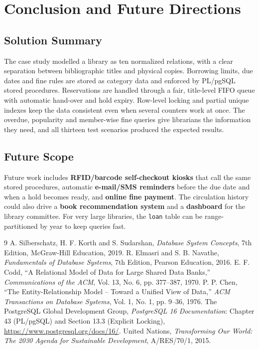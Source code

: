 \documentclass[11pt,a4paper]{report}
\begin{document}

\section{Conclusion and Future Directions}

\subsection{Solution Summary}
The case study modelled a library as ten normalized relations, with a clear separation between bibliographic titles and physical copies. Borrowing limits, due dates and fine rules are stored as category data and enforced by PL/pgSQL stored procedures. Reservations are handled through a fair, title-level FIFO queue with automatic hand-over and hold expiry. Row-level locking and partial unique indexes keep the data consistent even when several counters work at once. The overdue, popularity and member-wise fine queries give librarians the information they need, and all thirteen test scenarios produced the expected results.

\subsection{Future Scope}
Future work includes \textbf{RFID/barcode self-checkout kiosks} that call the same stored procedures, automatic \textbf{e-mail/SMS reminders} before the due date and when a hold becomes ready, and \textbf{online fine payment}. The circulation history could also drive a \textbf{book recommendation system} and a \textbf{dashboard} for the library committee. For very large libraries, the \texttt{loan} table can be range-partitioned by year to keep queries fast.


\begin{thebibliography}{9}
     A. Silberschatz, H. F. Korth and S. Sudarshan, \textit{Database System Concepts}, 7th Edition, McGraw-Hill Education, 2019.
     R. Elmasri and S. B. Navathe, \textit{Fundamentals of Database Systems}, 7th Edition, Pearson Education, 2016.
     E. F. Codd, ``A Relational Model of Data for Large Shared Data Banks,'' \textit{Communications of the ACM}, Vol. 13, No. 6, pp. 377--387, 1970.
     P. P. Chen, ``The Entity-Relationship Model -- Toward a Unified View of Data,'' \textit{ACM Transactions on Database Systems}, Vol. 1, No. 1, pp. 9--36, 1976.
     The PostgreSQL Global Development Group, \textit{PostgreSQL 16 Documentation}: Chapter 43 (PL/pgSQL) and Section 13.3 (Explicit Locking), \url{https://www.postgresql.org/docs/16/}.
     United Nations, \textit{Transforming Our World: The 2030 Agenda for Sustainable Development}, A/RES/70/1, 2015.
\end{thebibliography}
\end{document}

